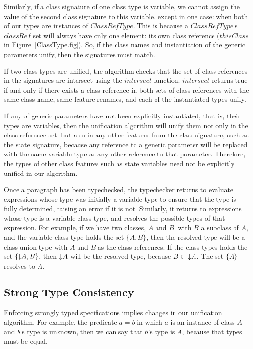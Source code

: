 Similarly, if a class signature of one class type is variable, we
cannot assign the value of the second class signature to this
variable, except in one case: when both of our types are instances of
$ClassRefType$. This is because a $ClassRefType$'s $classRef$ set will
always have only one element: its own class reference ($thisClass$ in
Figure~\ref{ClassType.fig}). So, if the class names and instantiation
of the generic parameters unify, then the signatures must match.

If two class types are unified, the algorithm checks that the set of
class references in the signatures are intersect using the $intersect$
function. $intersect$ returns true if and only if there exists a class
reference in both sets of class references with the same class name,
same feature renames, and each of the instantiated types unify.

If any of generic parameters have not been explicitly instantiated,
that is, their types are variables, then the unification algorithm
will unify them not only in the class reference set, but also in any
other features from the class signature, such as the state signature,
because any reference to a generic parameter will be replaced with the
same variable type as any other reference to that
parameter. Therefore, the types of other class features such as state
variables need not be explicitly unified in our algorithm.

Once a paragraph has been typechecked, the typechecker returns to
evaluate expressions whose type was initially a variable type to
ensure that the type is fully determined, raising an error if it is
not. Similarly, it returns to expressions whose type is a variable
class type, and resolves the possible types of that expression. For
example, if we have two classes, $A$ and $B$, with $B$ a subclass of
$A$, and the variable class type holds the set $\{A, B\}$, then the
resolved type will be a class union type with $A$ and $B$ as the class
references. If the class types holds the set $\{\mathord\downarrow A, B\}$, then
$\mathord\downarrow A$ will be the resolved type, because $B \subset \mathord\downarrow A$. The
set $\{A\}$ resolves to $A$.

\subsection{Strong Type Consistency}

Enforcing strongly typed specifications implies changes in our
unification algorithm.  For example, the predicate $a = b$ in which
$a$ is an instance of class $A$ and $b$'s type is unknown, then we can
say that $b$'s type is $A$, because that types must be equal.

